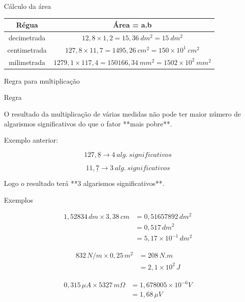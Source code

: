 \documentclass[aspectratio=169,10pt]{beamer}
\begin{document}

\begin{frame}{Cálculo da área}

\begin{center}
\begin{tabular}{cc}
Régua & Área = a.b \\
\hline
decimetrada & $12,8 \times 1,2 = 15,36\ dm^2 = 15\ dm^2$ \\
centimetrada & $127,8 \times 11,7 = 1495,26\ cm^2 = 150 \times 10^1\ cm^2$ \\
milimetrada & $1279,1 \times 117,4 = 150166,34\ mm^2 = 1502 \times 10^2\ mm^2$
\end{tabular}
\end{center}

\end{frame}



\begin{frame}{Regra para multiplicação}

\begin{block}{Regra}

O resultado da multiplicação de várias medidas não pode ter maior número
de algarismos significativos do que o fator **mais pobre**.

\end{block}

Exemplo anterior:

\[
127,\underline{8} \rightarrow 4\ alg.\ significativos
\]

\[
11,\underline{7} \rightarrow 3\ alg.\ significativos
\]

Logo o resultado terá **3 algarismos significativos**.

\end{frame}


\begin{frame}{Exemplos}

\begin{align*}
1,52834\,dm \times 3,38\,cm &= 0,51657892\,dm^2 \\
&= 0,517\,dm^2 \\
&= 5,17\times10^{-1}\,dm^2
\end{align*}

\begin{align*}
832\,N/m \times 0,25\,m^2 &= 208\,N.m \\
&= 2,1\times10^2\,J
\end{align*}

\begin{align*}
0,315\,\mu A \times 5327\,m\Omega
&= 1,678005\times10^{-6}V \\
&= 1,68\,\mu V
\end{align*}

\end{frame}
\end{document}
